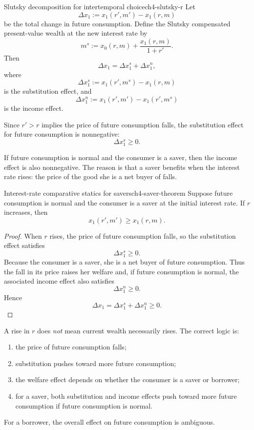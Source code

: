 \begin{definition}{Slutsky decomposition for intertemporal choice}{ch4-slutsky-r}
Let
\[
\Delta x_1 := x_1(r',m')-x_1(r,m)
\]
be the total change in future consumption. Define the Slutsky compensated present-value wealth at the new interest rate by
\[
m^s := x_0(r,m)+\frac{x_1(r,m)}{1+r'}.
\]
Then
\[
\Delta x_1 = \Delta x_1^s + \Delta x_1^n,
\]
where
\[
\Delta x_1^s := x_1(r',m^s)-x_1(r,m)
\]
is the substitution effect, and
\[
\Delta x_1^n := x_1(r',m')-x_1(r',m^s)
\]
is the income effect.
\end{definition}

Since $r'>r$ implies the price of future consumption falls, the substitution effect for future consumption is nonnegative:
\[
\Delta x_1^s \ge 0.
\]

If future consumption is normal and the consumer is a saver, then the income effect is also nonnegative. The reason is that a saver benefits when the interest rate rises: the price of the good she is a net buyer of falls.

\begin{theorem}{Interest-rate comparative statics for savers}{ch4-saver-theorem}
Suppose future consumption is normal and the consumer is a saver at the initial interest rate. If $r$ increases, then
\[
x_1(r',m') \ge x_1(r,m).
\]
\end{theorem}

\begin{proof}
When $r$ rises, the price of future consumption falls, so the substitution effect satisfies
\[
\Delta x_1^s \ge 0.
\]
Because the consumer is a saver, she is a net buyer of future consumption. Thus the fall in its price raises her welfare and, if future consumption is normal, the associated income effect also satisfies
\[
\Delta x_1^n \ge 0.
\]
Hence
\[
\Delta x_1=\Delta x_1^s+\Delta x_1^n\ge 0.
\]
\end{proof}

\begin{examtip}
A rise in $r$ does \emph{not} mean current wealth necessarily rises. The correct logic is:
\begin{enumerate}
    \item the price of future consumption falls;
    \item substitution pushes toward more future consumption;
    \item the welfare effect depends on whether the consumer is a saver or borrower;
    \item for a saver, both substitution and income effects push toward more future consumption if future consumption is normal.
\end{enumerate}
For a borrower, the overall effect on future consumption is ambiguous.
\end{examtip}

